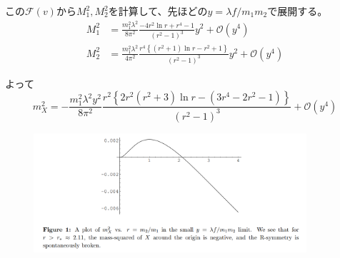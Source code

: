 \documentclass[
  unicode,a4paper,9pt,
  xcolor = {dvipsnames,svgnames},
  hyperref ={colorlinks=true,citecolor=Navy,linkcolor=NavyBlue,urlcolor=purple},
  ja=standard,lualatex
]{beamer}
\begin{document}
\begin{frame}

  この$\mathcal{F}(v)$から$M_{1}^2, M_{2}^{2}$を計算して、先ほどの$y=\lambda f/m_{1}m_{2}$で展開する。
  \begin{align}
    M_{1}^2
     & =
    \frac{m_{1}^2\lambda^2}{8\pi^2}
    \frac{-4r^2\ln r+r^4-1}{(r^2-1)^3}
    y^2
    +
    \mathcal{O}(y^4)
    \nonumber
    \\
    M_{2}^2
     & =
    \frac{m_{1}^2\lambda^2}{4\pi^2}
    \frac{r^4\left\{ (r^2+1)\ln r-r^2+1 \right\}}{(r^2-1)^3}
    y^2
    +
    \mathcal{O}(y^4)
    \nonumber
  \end{align}

  よって
  \begin{equation}
    m_{X}^2
    =
    -
    \frac{m_{1}^2\lambda^2 y^2}{8\pi^2}
    \dfrac{r^2 \left\{ 2r^2(r^2+3)\ln r-(3r^4-2r^2-1) \right\}}{(r^2-1)^3}
    +
    \mathcal{O}(y^4)
    \nonumber
  \end{equation}

  \begin{figure}
    \centering
    \includegraphics[width=0.9\textwidth]{fig/Shih2007avfig.PNG}
  \end{figure}

\end{frame}
\end{document}
